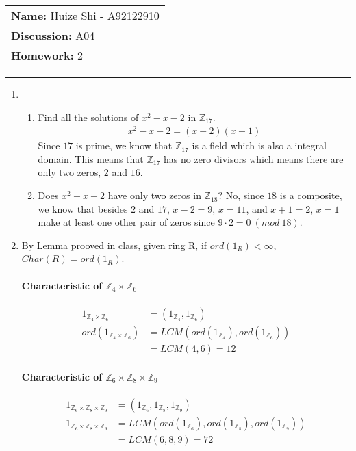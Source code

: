 \documentclass[12pt]{article}
\begin{document}
\null\hfill\begin{tabular}[t]{l@{}}
	\textbf{Name: }Huize Shi - A92122910 \\
	\textbf{Discussion: }A04 \\
	\textbf{Homework: }2
\end{tabular}
\noindent\rule{\textwidth}{0.5pt}

\begin{enumerate}
	\item
		\begin{enumerate}
			\item Find all the solutions of $x^2 - x - 2$ in $\mathbb{Z}_{17}$.
				\begin{align*}
					x^2 - x - 2 =(x-2)(x+1)
				\end{align*}
				Since $17$ is prime, we know that $\mathbb{Z}_{17}$ is a field which is
				also a integral domain. This means that $\mathbb{Z}_{17}$ has no zero
				divisors which means there are only two zeros, $2$ and $16$.
			\item Does $x^2 - x - 2$ have only two zeros in  $\mathbb{Z}_{18}$?
				No, since $18$ is a composite, we know that besides $2$ and $17$,
				$x-2=9$, $x=11$, and $x+1=2$, $x=1$ make at least one other pair of
				zeros since $9 \cdot 2 = 0\ (mod\ 18)$.
		\end{enumerate}

	\item
		By Lemma prooved in class, given ring R, if $ord(1_R)<\infty$,
		$Char(R)=ord(1_R)$.
		\paragraph{Characteristic of $\mathbb{Z}_4 \times \mathbb{Z}_{6}$}
		\begin{align*}
			1_{\mathbb{Z}_4 \times \mathbb{Z}_{6}} &= (1_{\mathbb{Z}_4},
			1_{\mathbb{Z}_{6}})\\
			ord(1_{\mathbb{Z}_4 \times \mathbb{Z}_{6}}) &= LCM\left(
			ord(1_{\mathbb{Z}_4}), ord(1_{\mathbb{Z}_{6}})\right)\\
			&= LCM(4, 6) = 12
		\end{align*}
		\paragraph{Characteristic of $\mathbb{Z}_6 \times \mathbb{Z}_{8} \times
		\mathbb{Z}_{9}$}
		\begin{align*}
			1_{\mathbb{Z}_6 \times \mathbb{Z}_{8} \times \mathbb{Z}_{9}} &=
			(1_{\mathbb{Z}_6}, 1_{\mathbb{Z}_{8}}, 1_{\mathbb{Z}_{9}})\\
			1_{\mathbb{Z}_6 \times \mathbb{Z}_{8} \times \mathbb{Z}_{9}} &=
			LCM\left(ord(1_{\mathbb{Z}_6}), ord(1_{\mathbb{Z}_{8}}),
			ord(1_{\mathbb{Z}_{9}})\right)\\
			&= LCM(6, 8, 9) = 72
		\end{align*}


\end{enumerate}
\end{document}
